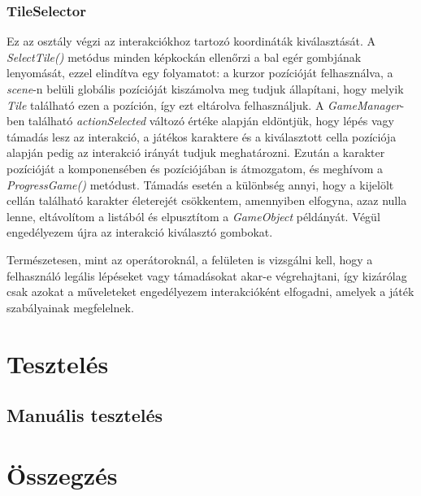 \documentclass[
]{thesis-ekf}
\theoremstyle{definition}
\theoremstyle{remark}
\begin{document}
\subsection{TileSelector} \label{tileselector}

Ez az osztály végzi az interakciókhoz tartozó koordináták kiválasztását. A \emph{SelectTile()} metódus minden képkockán ellenőrzi a bal egér gombjának lenyomását, ezzel elindítva egy folyamatot: a kurzor pozícióját felhasználva, a \emph{scene}-n belüli globális pozícióját kiszámolva meg tudjuk állapítani, hogy melyik \emph{Tile} található ezen a pozíción, így ezt eltárolva felhasználjuk. A \emph{GameManager}-ben található \emph{actionSelected} változó értéke alapján eldöntjük, hogy lépés vagy támadás lesz az interakció, a játékos karaktere és a kiválasztott cella pozíciója alapján pedig az interakció irányát tudjuk meghatározni. Ezután a karakter pozícióját a komponensében és pozíciójában is átmozgatom, és meghívom a \emph{ProgressGame()} metódust. Támadás esetén a különbség annyi, hogy a kijelölt cellán található karakter életerejét csökkentem, amennyiben elfogyna, azaz nulla lenne, eltávolítom a listából és elpusztítom a \emph{GameObject} példányát. Végül engedélyezem újra az interakció kiválasztó gombokat.

Természetesen, mint az operátoroknál, a felületen is vizsgálni kell, hogy a felhasználó legális lépéseket vagy támadásokat akar-e végrehajtani, így kizárólag csak azokat a műveleteket engedélyezem interakcióként elfogadni, amelyek a játék szabályainak megfelelnek.

\chapter{Tesztelés}

\section{Manuális tesztelés}

\chapter*{Összegzés}
\end{document}
